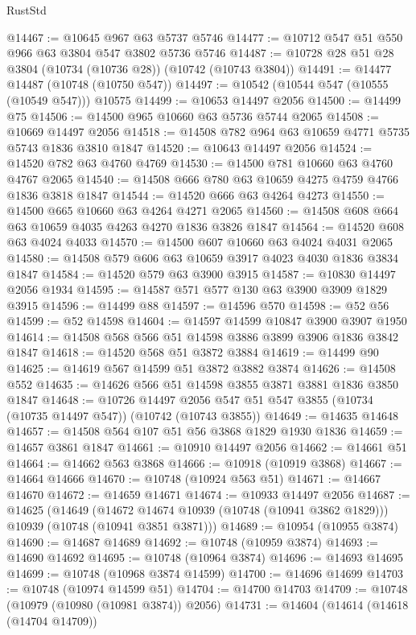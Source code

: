 \begin{lexlean}{RustStd}
\begin{coremodule}
@14467 := @10645 @967 @63 @5737 @5746
@14477 := @10712 @547 @51 @550 @966 @63 @3804 @547 @3802 @5736 @5746
@14487 := @10728 @28 @51 @28 @3804 (@10734 (@10736 @28)) (@10742 (@10743 @3804))
@14491 := @14477 @14487 (@10748 (@10750 @547))
@14497 := @10542 (@10544 @547 (@10555 (@10549 @547))) @10575
@14499 := @10653 @14497 @2056
@14500 := @14499 @75
@14506 := @14500 @965 @10660 @63 @5736 @5744 @2065
@14508 := @10669 @14497 @2056
@14518 := @14508 @782 @964 @63 @10659 @4771 @5735 @5743 @1836 @3810 @1847
@14520 := @10643 @14497 @2056
@14524 := @14520 @782 @63 @4760 @4769
@14530 := @14500 @781 @10660 @63 @4760 @4767 @2065
@14540 := @14508 @666 @780 @63 @10659 @4275 @4759 @4766 @1836 @3818 @1847
@14544 := @14520 @666 @63 @4264 @4273
@14550 := @14500 @665 @10660 @63 @4264 @4271 @2065
@14560 := @14508 @608 @664 @63 @10659 @4035 @4263 @4270 @1836 @3826 @1847
@14564 := @14520 @608 @63 @4024 @4033
@14570 := @14500 @607 @10660 @63 @4024 @4031 @2065
@14580 := @14508 @579 @606 @63 @10659 @3917 @4023 @4030 @1836 @3834 @1847
@14584 := @14520 @579 @63 @3900 @3915
@14587 := @10830 @14497 @2056 @1934
@14595 := @14587 @571 @577 @130 @63 @3900 @3909 @1829 @3915
@14596 := @14499 @88
@14597 := @14596 @570
@14598 := @52 @56
@14599 := @52 @14598
@14604 := @14597 @14599 @10847 @3900 @3907 @1950
@14614 := @14508 @568 @566 @51 @14598 @3886 @3899 @3906 @1836 @3842 @1847
@14618 := @14520 @568 @51 @3872 @3884
@14619 := @14499 @90
@14625 := @14619 @567 @14599 @51 @3872 @3882 @3874
@14626 := @14508 @552
@14635 := @14626 @566 @51 @14598 @3855 @3871 @3881 @1836 @3850 @1847
@14648 := @10726
    @14497
    @2056
    @547
    @51
    @547
    @3855
    (@10734 (@10735 @14497 @547))
    (@10742 (@10743 @3855))
@14649 := @14635 @14648
@14657 := @14508 @564 @107 @51 @56 @3868 @1829 @1930 @1836
@14659 := @14657 @3861 @1847
@14661 := @10910 @14497 @2056
@14662 := @14661 @51
@14664 := @14662 @563 @3868
@14666 := @10918 (@10919 @3868)
@14667 := @14664 @14666
@14670 := @10748 (@10924 @563 @51)
@14671 := @14667 @14670
@14672 := @14659 @14671
@14674 := @10933 @14497 @2056
@14687 := @14625
    (@14649
      (@14672 @14674 @10939 (@10748 (@10941 @3862 @1829)))
      @10939
      (@10748 (@10941 @3851 @3871)))
@14689 := @10954 (@10955 @3874)
@14690 := @14687 @14689
@14692 := @10748 (@10959 @3874)
@14693 := @14690 @14692
@14695 := @10748 (@10964 @3874)
@14696 := @14693 @14695
@14699 := @10748 (@10968 @3874 @14599)
@14700 := @14696 @14699
@14703 := @10748 (@10974 @14599 @51)
@14704 := @14700 @14703
@14709 := @10748 (@10979 (@10980 (@10981 @3874)) @2056)
@14731 := @14604
    (@14614
      (@14618 (@14704 @14709))

\end{coremodule}
\end{lexlean}

